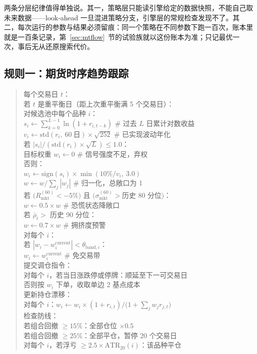 两条分层纪律值得单独说。其一，策略层只能读引擎给定的数据快照，不能自己取未来数据——look-ahead 一旦混进策略分支，引擎层的常规检查发现不了。其二，每次运行的参数与结果必须留痕：同一个策略在不同参数下跑一百次，账本里就是一百条记录，第~\ref{sec:mtflow}~节的试验族就以这份账本为准；只记最优一次，事后无从还原搜索代价。

\subsection{规则一：期货时序趋势跟踪}

\begin{quote}\ttfamily\small
每个交易日 $t$：\\[2pt]
\quad 若 $t$ 是重平衡日（距上次重平衡满 5 个交易日）：\\[2pt]
\qquad 对候选池中每个品种 $i$：\\
\qquad\qquad $s_i \gets \sum_{k=0}^{L-1}\ln(1+r_{i,t-k})$ \hfill \# 过去 $L$ 日累计对数收益\\
\qquad\qquad $v_i \gets \mathrm{std}(r_i,\ 60\ \text{日})\times\sqrt{252}$ \hfill \# 已实现波动年化\\
\qquad\qquad 若 $|s_i|/(\mathrm{std}(r_i)\times\sqrt L)\le 1.0$：\\
\qquad\qquad\qquad 目标权重 $w_i \gets 0$ \hfill \# 信号强度不足，弃权\\
\qquad\qquad 否则：\\
\qquad\qquad\qquad $w_i \gets \mathrm{sign}(s_i)\times\min(10\%/v_i,\ 3.0)$\\[2pt]
\qquad $w \gets w/\sum_j|w_j|$ \hfill \# 归一化，总敞口为 1\\[2pt]
\qquad 若 $\big(R_{\text{mkt}}^{(60)}<-5\%\big)$ 且 $\big(\sigma_{\text{mkt}}^{(60)}>\text{历史 80 分位}\big)$：\\
\qquad\qquad $w \gets 0.5\times w$ \hfill \# 恐慌状态降敞口\\[2pt]
\qquad 若 $\bar\rho_t>$ 历史 90 分位：\\
\qquad\qquad $w \gets 0.7\times w$ \hfill \# 拥挤度预警\\[2pt]
\qquad 对每个 $i$：\\
\qquad\qquad 若 $|w_i-w_i^{\text{current}}|<\theta_{\text{band},i}$：\\
\qquad\qquad\qquad $w_i \gets w_i^{\text{current}}$ \hfill \# 免交易带\\[2pt]
\qquad 提交调仓指令：\\
\qquad\qquad 对每个 $i$，若当日涨跌停或停牌：顺延至下一可交易日\\
\qquad\qquad 否则按 $w_i$ 下单，收取单边 2 基点成本\\[2pt]
\quad 更新持仓漂移：\\
\qquad 对每个 $i$：$w_i \gets w_i\times(1+r_{i,t})/\big(1+\sum_j w_j r_{j,t}\big)$\\[2pt]
\quad 检查防线：\\
\qquad 若组合回撤 $\ge15\%$：全部仓位 $\times0.5$\\
\qquad 若组合回撤 $\ge25\%$：全部平仓，暂停 20 个交易日\\
\qquad 对每个 $i$，若浮亏 $\ge2.5\times\text{ATR}_{20}(i)$：该品种平仓
\end{quote}

